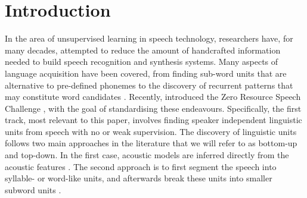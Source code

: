 \section{Introduction}
\label{sec:introduction}
In the area of unsupervised learning in speech technology, researchers have, for many decades, attempted to reduce the amount of handcrafted information needed to build speech recognition and synthesis systems.
Many aspects of language acquisition have been covered, from finding sub-word units that are alternative to pre-defined phonemes \parencite{LeeEtAl1988,SvendsenEtAl1989,BacchianiEtAl1996,Huijbregts, OGrady:2008up} to the discovery of recurrent patterns that may constitute word candidates \cite{Rasanen2011149, ParkAndGlass2008, Aimetti2010, StoutenEtAl2008phonepatterns, DriesenEtAl2009adaptivenon-negative, gs:VanhainenAndSalvi2012Interspeech, gs:VanhainenAndSalvi2014ICASSP}.
Recently, \citeauthor{versteegh2015zero} introduced the Zero Resource Speech Challenge \parencite{versteegh2015zero}, with the goal of standardising these endeavours.
Specifically, the first track, most relevant to this paper, involves finding speaker independent linguistic units from speech with no or weak supervision.
The discovery of linguistic units follows two main approaches in the literature that we will refer to as bottom-up and top-down. 
In the first case, acoustic models are inferred directly from the acoustic features \parencite{varadarajan2008unsupervised, lee2012nonparametric, siu2014unsupervised, chen2015parallel, zhang2010towards, versteegh2016zero, heck2016unsupervised, synnaeve2016temporal}.
The second approach is to first segment the speech into syllable- or word-like units, and afterwards break these units into smaller subword units \parencite{jansen2013weak, park2008unsupervised, jansen2011efficient, versteegh2015zero, jansen2011towards, jansen2013weak, synnaeve2014phonetics, thiolliere2015hybrid, versteegh2016zero, zeghidour2016deep, kamper2015unsupervised, renshaw2015comparison}.

